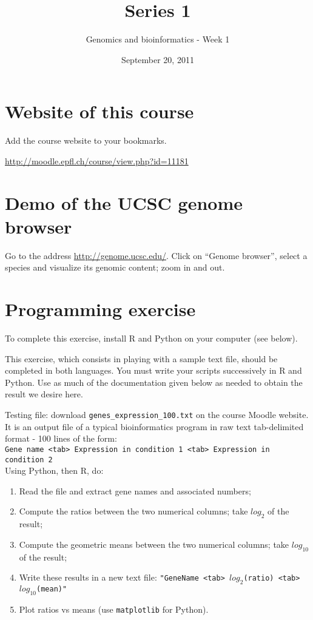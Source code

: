 \documentclass[a4paper,11pt]{article}
\title{Series 1}
\date{September 20, 2011}
\author{Genomics and bioinformatics - Week 1}
\begin{document}
\maketitle

\section{Website of this course}
Add the course website to your bookmarks.

\url{http://moodle.epfl.ch/course/view.php?id=11181}

\section{Demo of the UCSC genome browser}
Go to the address \url{http://genome.ucsc.edu/}. Click on ``Genome browser'', select a species 
and visualize its genomic content; zoom in and out.

\section{Programming exercise}
To complete this exercise, install R and Python on your computer (see below).

This exercise, which consists in playing with a sample text file, should be completed in both languages. You must write your scripts successively in R and Python. Use as much of the documentation given below as needed to obtain the result we desire here.

Testing file: download \texttt{genes\_expression\_100.txt} on the course Moodle website. It is an output file of a typical bioinformatics program in raw text tab-delimited format - 100 lines of the form:\\

\texttt{Gene name <tab> Expression in condition 1 <tab> Expression in condition 2}\\

Using Python, then R, do: 
\begin{enumerate}
\item Read the file and extract gene names and associated numbers;
\item Compute the ratios between the two numerical columns; take $log_{2}$ of the result;
\item Compute the geometric means between the two numerical columns; take $log_{10}$ of the result;
\item Write these results in a new text file: \texttt{"GeneName <tab> $log_2$(ratio) <tab> $log_{10}$(mean)"}
\item Plot ratios vs means (use  \texttt{matplotlib} for Python).
\end{enumerate}
\end{document}
